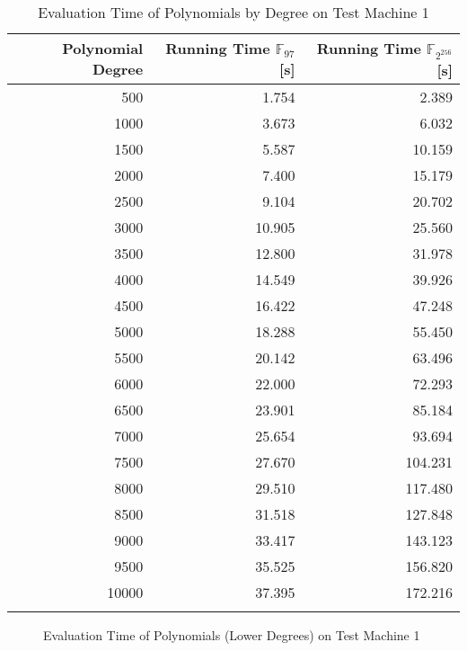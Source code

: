 \begin{table}[ht]
  \centering
  \begin{tabular}{rrr}
    \toprule
    Polynomial Degree & Running Time $\mathbb{F}_{97}$ [s] & Running Time
    $\mathbb{F}_{2^{256}}$ [s]\\
    \midrule
    500 &  1.754 &   2.389 \\
    1000 &  3.673 &   6.032 \\
    1500 &  5.587 &  10.159 \\
    2000 &  7.400 &  15.179 \\
    2500 &  9.104 &  20.702 \\
    3000 & 10.905 &  25.560 \\
    3500 & 12.800 &  31.978 \\
    4000 & 14.549 &  39.926 \\
    4500 & 16.422 &  47.248 \\
    5000 & 18.288 &  55.450 \\
    5500 & 20.142 &  63.496 \\
    6000 & 22.000 &  72.293 \\
    6500 & 23.901 &  85.184 \\
    7000 & 25.654 &  93.694 \\
    7500 & 27.670 & 104.231 \\
    8000 & 29.510 & 117.480 \\
    8500 & 31.518 & 127.848 \\
    9000 & 33.417 & 143.123 \\
    9500 & 35.525 & 156.820 \\
    10000 & 37.395 & 172.216 \\
    \bottomrule
    \label{tab:poly-deg-t}
  \end{tabular}
  \caption{Evaluation Time of Polynomials by Degree on Test Machine 1}
\end{table}

\begin{figure}[ht]
  \centering
  
  \caption{Evaluation Time of Polynomials (Lower Degrees) on Test Machine 1}
  \label{fig:poly-deg-t-small}
\end{figure}

